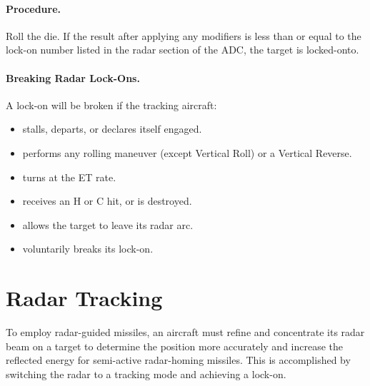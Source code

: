 {\paragraph{Procedure.} Roll the die. If the result after applying any modifiers is less than or equal to the lock-on number listed in the radar section of the ADC, the target is locked-onto. 

\paragraph{Breaking Radar Lock-Ons.} A lock-on will be broken if the tracking aircraft:

\begin{itemize}

    \item stalls, departs, or declares itself engaged.

    \item performs any rolling maneuver (except Vertical Roll) or a Vertical Reverse.

    \item turns at the ET rate.

    \item receives an H or C hit, or is destroyed.

    \item allows the target to leave its radar arc.

    \item voluntarily breaks its lock-on.

\end{itemize}

}{
\section{Radar Tracking}
\label{rule:radar-tracking}

To employ radar-guided missiles, an aircraft must refine and concentrate its radar beam on a target to determine the position more accurately and increase the reflected energy for semi-active radar-homing missiles. This is accomplished by switching the radar to a tracking mode and achieving a lock-on.

}
